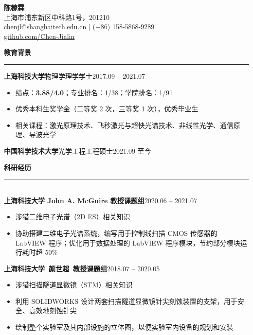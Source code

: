\documentclass[letterpaper,11pt]{article}
\begin{document}
\begin{center}
    {\LARGE\bfseries{}陈稼霖}\\
    \vspace{1ex}
    上海市浦东新区中科路1号，201210\\
    chenjl@shanghaitech.edu.cn | (+86) 158-5868-9289\\
    \href{https://github.com/Chen-Jialin}{github.com/Chen-Jialin}\\
\end{center}

{\Large\bfseries{}教育背景}\\
\rule[1.5ex]{\textwidth}{1pt}
{\songti\large\bfseries{}上海科技大学}{\large\quad{}物理学\quad{}理学学士}\hfill{2017.09 -- 2021.07}\\
\vspace{-4ex}
\begin{itemize}
    \item 绩点：{\bfseries{}3.88/4.0}；专业排名：1/38；学院排名：1/91
    \item 优秀本科生奖学金（二等奖 2 次，三等奖 1 次），优秀毕业生
    \item 相关课程：激光原理技术、飞秒激光与超快光谱技术、非线性光学、通信原理、导波光学
\end{itemize}
{\songti\large\bfseries{}中国科学技术大学}{\large\quad{}光学工程\quad{}工程硕士}\hfill{2021.09 至今}\\
\vspace{-1ex}%

{\Large\bfseries{}科研经历}\\
\rule[1.5ex]{\columnwidth}{1pt}\\
{\songti\large\bfseries{}上海科技大学 John A. McGuire 教授课题组}\hfill{2020.06 -- 2021.07}\\
\vspace{-4ex}
\begin{itemize}
    \item 涉猎二维电子光谱（2D ES）相关知识
    \item 协助搭建二维电子光谱系统，编写用于控制线扫描 CMOS 传感器的 LabVIEW 程序；优化用于数据处理的 LabVIEW 程序模块，节约部分模块运行耗时超 50\%
\end{itemize}
{\songti\large\bfseries{}上海科技大学~颜世超~教授课题组}\hfill{2018.07 -- 2020.05}\\
\vspace{-4ex}
\begin{itemize}
    \item 涉猎扫描隧道显微镜（STM）相关知识
    \item 利用 SOLIDWORKS 设计两套扫描隧道显微镜针尖刻蚀装置的支架，用于安全、高效地刻蚀针尖
    \item 绘制整个实验室及其内部设施的立体图，以便实验室内设备的规划和安装
\end{itemize}
\vspace{1ex}
\end{document}

